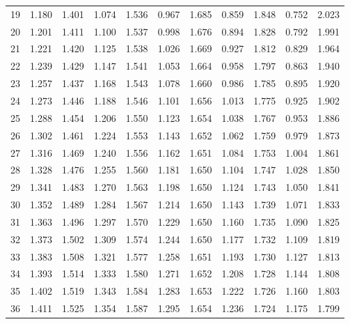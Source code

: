 \documentclass[12pt]{article}
\begin{document}
\begin{table}
\begin{center}
{\begin{tabular}{|c|c|c|c|c|c|c|c|c|c|c|}
19&1.180&1.401&1.074&1.536&0.967&1.685&0.859&1.848&
0.752&2.023\\


20&1.201&1.411&1.100&1.537&0.998&1.676&0.894&1.828&0.792&1.991\\


21&1.221&
1.420&1.125&1.538&1.026&1.669&0.927&1.812&0.829&1.964\\


22&1.239&1.429&1.147&
1.541&1.053&1.664&0.958&1.797&0.863&1.940\\


23&1.257&1.437&1.168&1.543&1.078 &1.660&0.986& 1.785&0.895&1.920\\


24&1.273&1.446&1.188&1.546&1.101&1.656&1.013&
1.775&0.925&1.902\\


25&1.288&1.454&1.206&1.550&1.123&1.654&1.038&1.767&0.953&
1.886\\


26&
1.302&1.461&1.224&1.553&1.143&1.652&1.062&1.759&0.979&1.873\\


27&1.316&1.469&
1.240&1.556&1.162&1.651&1.084&1.753&1.004&1.861\\


28&1.328&1.476&1.255&1.560& 1.181&1.650&1.104&1.747&1.028&1.850
\\

29&1.341&1.483&1.270&1.563&1.198&1.650&
1.124&1.743&1.050&1.841\\

30&1.352&1.489&1.284&1.567&1.214&1.650&1.143&1.739&
1.071&1.833\\


31&1.363&1.496&1.297&1.570&1.229&1.650&1.160&1.735&1.090&1.825\\


32&1.373&
1.502&1.309&1.574&1.244&1.650&1.177&1.732&1.109&1.819\\

33&1.383&1.508&1.321&
1.577&1.258&1.651&1.193&1.730&1.127&1.813\\


34&1.393&1.514&1.333&1.580&1.271&
1.652&1.208&1.728&1.144&1.808\\

35&1.402&1.519&1.343&1.584&1.283&1.653&1.222&
1.726&1.160&1.803\\


36&1.411&1.525&1.354&1.587&1.295&1.654&1.236&1.724&1.175&
1.799\\



\end{tabular}}
\end{center}
\end{table}
\end{document}
